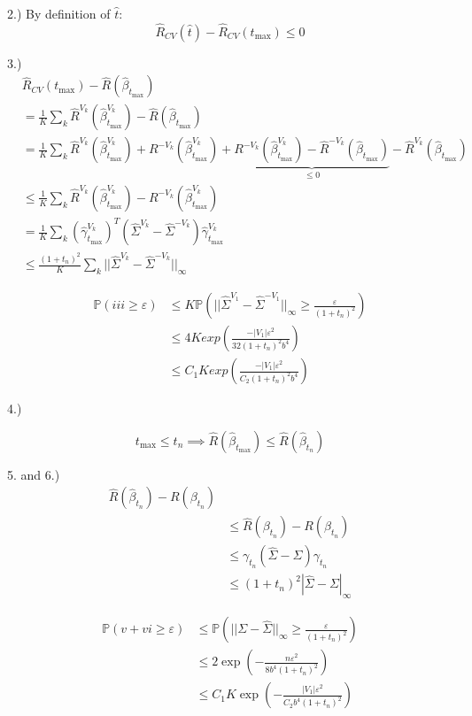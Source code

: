 \documentclass[12pt]{article}
\newcommand{\hbeta}{\hat \beta }
\newcommand{\pr}{{\mathbb P}}
\begin{document}
\begin{itemize}
  2.)
  By definition of $\hat t$:
  $$\hat R_{CV}(\hat t) - \hat R_{CV}(t_{\max}) \le 0$$

  3.)
  \begin{align*}&\hat R_{CV}(t_{\max} ) - \hat R(\hbeta_{t_{\max}})
    \\&= \frac1K \sum_{k} \hat R^{V_k}(\hat \beta^{V_k}_{t_{\max}}) - \hat R(\hat \beta_{t_{\max}})
    \\&= \frac1K \sum_{k} \hat R^{V_k}(\hat \beta^{V_k}_{t_{\max}}) + R^{-V_k}(\hat \beta^{V_k}_{t_{\max}}) + \underbrace{R^{-V_k}(\hat \beta^{V_k}_{t_{\max}}) -  \hat R^{-V_k}(\hat \beta_{t_{\max}}) }_{\le 0} - \hat R^{V_k}(\hat \beta_{t_{\max}})
    \\&\le \frac1K \sum_{k} \hat R^{V_k}(\hat \beta^{V_k}_{t_{\max}}) - R^{-V_k}(\hat \beta^{V_k}_{t_{\max}})
    \\&= \frac1K \sum_{k}  (\hat \gamma^{V_k}_{t_{\max}})^T(\hat \Sigma^{V_k} - \hat \Sigma^{-V_k})\hat \gamma^{V_k}_{t_{\max}}
    \\&\le \frac{(1+t_n)^2}K \sum_k ||\hat \Sigma^{V_k} - \hat \Sigma^{-V_k}||_{\infty}
  \end{align*}

  \begin{align*}\pr( iii \ge \varepsilon)
    &\le K \pr(||\hat \Sigma^{V_1} - \hat \Sigma^{-V_1}||_{\infty} \ge \frac{\varepsilon}{(1+t_n)^2})
    \\&\le 4K exp(\frac{-|V_1|\varepsilon^2}{32(1+t_n)^2b^4})
    \\&\le C_1K exp(\frac{-|V_1|\varepsilon^2}{C_2(1+t_n)^2b^4})
    \end{align*}

  4.)
  
  $$t_{\max} \le t_n \implies \hat R(\hbeta_{t_{\max}}) \le \hat R(\hbeta_{t_n})$$
  
  5. and 6.) 
  \begin{align*}
    \hat R(\hbeta_{t_n}) - R(\beta_{t_n})
    \\&\le\hat R(\beta_{t_n}) - R(\beta_{t_n})
    \\&\le  \gamma_{t_n}(\hat \Sigma  - \Sigma) \gamma_{t_n}
    \\&\le (1+t_n)^2|\hat \Sigma  - \Sigma|_{\infty}
  \end{align*}
  
  \begin{align*}
    \pr(v + vi \ge \varepsilon) &\le \mathbb P( ||\Sigma - \hat \Sigma||_{\infty} \ge \frac{\varepsilon}{(1+t_n)^2})
    \\&\le 2 \exp(-\frac{n \varepsilon^2}{8b^4(1+t_n)^2})
    \\&\le C_1 K \exp(-\frac{|V_1| \varepsilon^2}{C_2b^4(1+t_n)^2})
  \end{align*}
  

\end{itemize}
\end{document}
